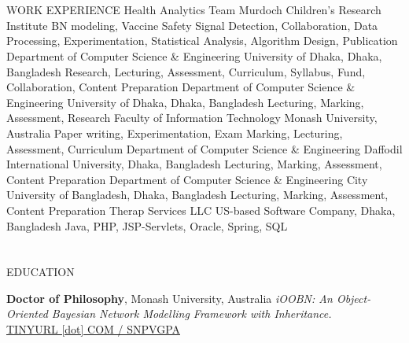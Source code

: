 \documentclass{my_cv}
\begin{document}
\section{\faPencil}{WORK EXPERIENCE}
%
    {Health Analytics Team}%
    {Murdoch Children's Research Institute}
    {BN modeling, Vaccine Safety Signal Detection, Collaboration, Data Processing, Experimentation, Statistical Analysis, Algorithm Design, Publication}
\vspace{-8pt}    
%
    {Department of Computer Science \& Engineering}%
    {University of Dhaka, Dhaka, Bangladesh}
    {Research, Lecturing, Assessment, Curriculum, Syllabus, Fund, Collaboration, Content Preparation}
\vspace{-8pt}    
%
    {Department of Computer Science \& Engineering}%
    {University of Dhaka, Dhaka, Bangladesh}
    {Lecturing, Marking, Assessment, Research}
\vspace{-3pt}    
%
    {Faculty of Information Technology}
    {Monash University, Australia}%
    {Paper writing, Experimentation, Exam Marking, Lecturing, Assessment, Curriculum}
\vspace{-3pt}    
%
    {Department of Computer Science \& Engineering}%
    {Daffodil International University, Dhaka, Bangladesh}
    {Lecturing, Marking, Assessment, Content Preparation}
\vspace{-8pt}    
%
    {Department of Computer Science \& Engineering}%
    {City University of Bangladesh, Dhaka, Bangladesh}
    {Lecturing, Marking, Assessment, Content Preparation}
\vspace{-8pt}    
%
    {Therap Services LLC}%
    {US-based Software Company, Dhaka, Bangladesh}
    {Java, PHP, JSP-Servlets, Oracle, Spring, SQL}


\section{\faGraduationCap}{EDUCATION}
    
{\textbf{Doctor of Philosophy}, Monash University, Australia} %
{{\em iOOBN: An Object-Oriented Bayesian Network Modelling Framework with Inheritance.}\\ \href{https://tinyurl.com/snpvgpa}{TINYURL [dot] COM / SNPVGPA}}
    
\end{document}
